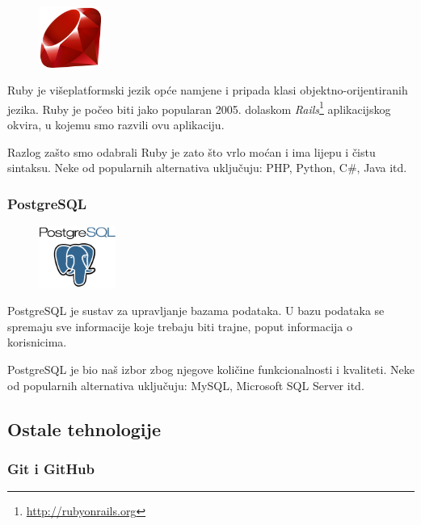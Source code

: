 \documentclass[11pt]{scrreprt}
\begin{document}
\begin{figure}
  \vspace{-10pt}
  \includegraphics[width=2cm]{logos/ruby}
  \vspace{-20pt}
\end{figure}

Ruby je višeplatformski jezik opće namjene i pripada klasi
objektno-orijentiranih jezika. Ruby je počeo biti jako popularan 2005. dolaskom
\emph{Rails}\footnote{\url{http://rubyonrails.org}} aplikacijskog okvira, u
kojemu smo razvili ovu aplikaciju.\cite{ruby}

Razlog zašto smo odabrali Ruby je zato što vrlo moćan i ima lijepu i čistu
sintaksu. Neke od popularnih alternativa uključuju: PHP, Python, C\#, Java itd.

\subsubsection{PostgreSQL}

\begin{figure}
  \vspace{-10pt}
  \includegraphics[width=2.5cm]{logos/postgresql}
  \vspace{-30pt}
\end{figure}

PostgreSQL je sustav za upravljanje bazama podataka. U bazu podataka se spremaju
sve informacije koje trebaju biti trajne, poput informacija o
korisnicima.\cite{postgresql}

PostgreSQL je bio naš izbor zbog njegove količine funkcionalnosti i kvaliteti.
Neke od popularnih alternativa uključuju: MySQL, Microsoft SQL Server itd.

\pagebreak

\subsection{Ostale tehnologije}

\subsubsection{Git i GitHub}
\end{document}
